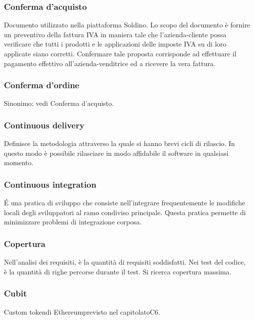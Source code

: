 \subsubsection*{Conferma d'acquisto}
Documento utilizzato nella piattaforma Soldino. Lo scopo del documento è fornire un preventivo della fattura IVA in maniera tale che l'azienda-cliente possa verificare che tutti i prodotti e le applicazioni delle imposte IVA su di loro applicate siano corretti. Confermare tale proposta corrisponde ad effettuare il pagamento effettivo all'azienda-venditrice ed a ricevere la vera fattura.

\subsubsection*{Conferma d'ordine}
Sinonimo: vedi Conferma d'acquisto\glo.

\subsubsection*{Continuous delivery}
Definisce la metodologia attraverso la quale si hanno brevi cicli di rilascio. In questo modo è possibile rilasciare in modo affidabile il software in qualsiasi momento.

\subsubsection*{Continuous integration}
\'E una pratica di sviluppo che consiste nell'integrare frequentemente le modifiche locali degli sviluppatori al
ramo condiviso principale. Questa pratica permette di minimizzare problemi di integrazione corposa.

\subsubsection*{Copertura}
Nell'analisi dei requisiti, è la quantità di requisiti soddisfatti. Nei test del codice, è la quantità di righe percorse durante il test. Si ricerca copertura massima.

\subsubsection*{Cubit}
Custom token\glosp di Ethereum\glosp previsto nel capitolato\glosp C6.

